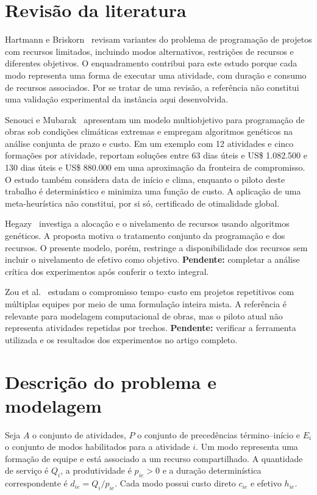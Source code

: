 \documentclass[12pt,a4paper]{article}
\begin{document}
\section{Revisão da literatura}
Hartmann e Briskorn~\cite{hartmann2022} revisam variantes do problema de programação de projetos com recursos limitados, incluindo modos alternativos, restrições de recursos e diferentes objetivos. O enquadramento contribui para este estudo porque cada modo representa uma forma de executar uma atividade, com duração e consumo de recursos associados. Por se tratar de uma revisão, a referência não constitui uma validação experimental da instância aqui desenvolvida.

Senouci e Mubarak~\cite{senouci2016} apresentam um modelo multiobjetivo para programação de obras sob condições climáticas extremas e empregam algoritmos genéticos na análise conjunta de prazo e custo. Em um exemplo com 12 atividades e cinco formações por atividade, reportam soluções entre 63 dias úteis e US\$ 1.082.500 e 130 dias úteis e US\$ 880.000 em uma aproximação da fronteira de compromisso. O estudo também considera data de início e clima, enquanto o piloto deste trabalho é determinístico e minimiza uma função de custo. A aplicação de uma meta-heurística não constitui, por si só, certificado de otimalidade global.

Hegazy~\cite{hegazy1999} investiga a alocação e o nivelamento de recursos usando algoritmos genéticos. A proposta motiva o tratamento conjunto da programação e dos recursos. O presente modelo, porém, restringe a disponibilidade dos recursos sem incluir o nivelamento de efetivo como objetivo. \textbf{Pendente:} completar a análise crítica dos experimentos após conferir o texto integral.

Zou et al.~\cite{zou2017} estudam o compromisso tempo--custo em projetos repetitivos com múltiplas equipes por meio de uma formulação inteira mista. A referência é relevante para modelagem computacional de obras, mas o piloto atual não representa atividades repetidas por trechos. \textbf{Pendente:} verificar a ferramenta utilizada e os resultados dos experimentos no artigo completo.

\section{Descrição do problema e modelagem}
Seja $A$ o conjunto de atividades, $P$ o conjunto de precedências término--início e $E_i$ o conjunto de modos habilitados para a atividade $i$. Um modo representa uma formação de equipe e está associado a um recurso compartilhado. A quantidade de serviço é $Q_i$, a produtividade é $p_{ie}>0$ e a duração determinística correspondente é $d_{ie}=Q_i/p_{ie}$. Cada modo possui custo direto $c_{ie}$ e efetivo $h_{ie}$.
\end{document}
